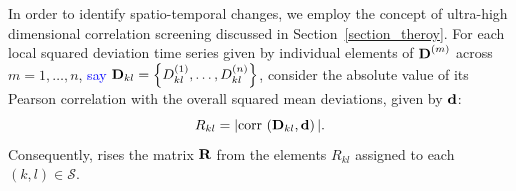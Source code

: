 \documentclass[journal]{IEEEtran}
\def\corr{\mbox{{\rm corr\,}}}
\newcommand{\vbeta}{\pmb{\beta}}
\newcommand{\vxi}{\pmb{\xi}}
\newcommand{\vD}{{\textbf D}}
\newcommand{\vd}{{\textbf d}}
\newcommand{\vR}{{\textbf R}}
\newcommand{\vX}{{\textbf X}}
\begin{document}
%
%


In order to identify spatio-temporal changes, we employ the concept of ultra-high dimensional correlation screening \cite{fan2020statistical} discussed in Section~\ref{section_theroy}. For each local squared deviation time series given by individual elements of $\vD^{(m)}$ across $m=1,\ldots,n$, \textcolor{blue}{say $\vD_{kl} = \left\lbrace D_{kl}^{(1)},\ldots,D_{kl}^{(n)} \right\rbrace$}, consider the absolute value of its Pearson correlation with the overall squared mean deviations, given by $\vd$:
\begin{equation*}\label{def_Rkld}
R_{kl}= |\corr \left( \vD_{kl}, \vd \right)|.
\end{equation*}
Consequently, rises the matrix $\vR$ from the elements $R_{kl}$ assigned to each $(k,l) \in \mathcal{S}$.
\end{document}
